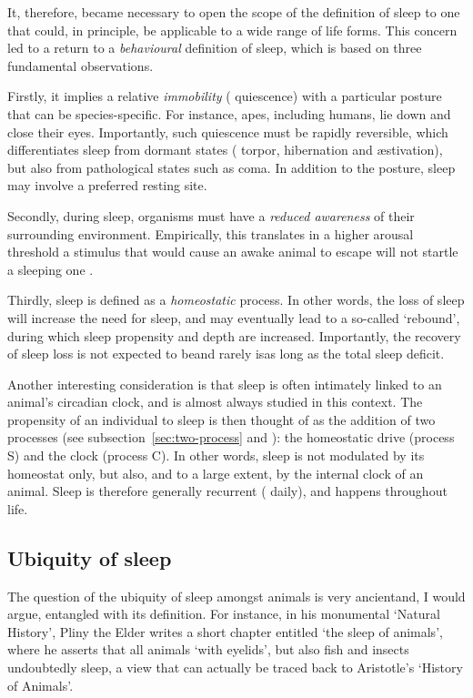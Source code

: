 It, therefore, became necessary to open the scope of the definition of sleep to one
that could, in principle, be applicable to a wide range of life forms.
This concern led to a return to a \emph{behavioural} definition of sleep, which is based on three fundamental observations\cite{pieron1913probleme,campbell_animal_1984,siegel_sleep_2009}.

Firstly, it implies a relative \emph{immobility} (\ie{} quiescence) with a particular posture\cite{flanigan_sleep_1973} that can be species-specific.
For instance, apes, including humans, lie down and close their eyes\cite{campbell_animal_1984}.
Importantly, such quiescence must be rapidly reversible, which differentiates sleep from dormant states (\eg{} torpor, hibernation and æstivation), but also from pathological states such as coma\cite{siegel_sleep_2009}.
In addition to the posture, sleep may involve a preferred resting site\cite{durie1981sleep}.

Secondly, during sleep, organisms must have a \emph{reduced awareness} of their surrounding environment.
Empirically, this translates in a higher arousal threshold\emd{}\eg{} a stimulus that would cause an awake animal to escape will not startle a sleeping one
\cite{huber_sleep_2004}.

Thirdly, sleep is defined as a \emph{homeostatic} process. 
In other words, the loss of sleep will increase the need for sleep, and may eventually lead to a so-called `rebound', during which sleep propensity and depth are increased\cite{allada_molecular_2017}.
Importantly, the recovery of sleep loss is not expected to be\emd{}and rarely is\emd{}as long\cite{siegel_sleep_2009} as the total sleep deficit. 

Another interesting consideration is that sleep is often intimately linked to an animal's circadian clock, and is almost always studied in this context.
The propensity of an individual to sleep is then thought of as the addition of two processes (see subsection~\ref{sec:two-process} and \cite{borbely_two_1982}): the homeostatic drive (process S) and the clock (process C). 
In other words, sleep is not modulated by its homeostat only, but also, and to a large extent, by the internal clock of an animal.
Sleep is therefore generally recurrent (\ie{} daily), and happens throughout life\cite{vorster_sleep_2015}.

\subsection{Ubiquity of sleep}
The question of the ubiquity of sleep amongst animals is very ancient\emd{}and, I would argue, entangled with its definition.
For instance, in his monumental `Natural History', Pliny the Elder writes a short chapter entitled `the sleep of animals', where he asserts that all animals `with eyelids', but also fish and insects undoubtedly sleep\cite[book~X, chap.~97]{pliny_the_elder_natural_1855}, a view that can actually be traced back to Aristotle's
`History of Animals'\cite[\eg{} book~IV, chap.~10]{aristotle_history_1965}.

